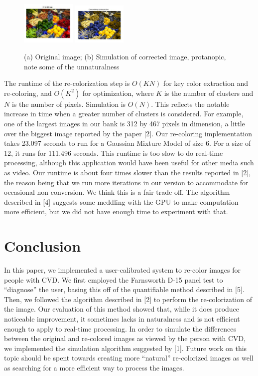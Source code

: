 \documentclass[10pt,twocolumn,letterpaper]{article}
\begin{document}
\begin{figure}[h]
  \includegraphics[width=0.23\textwidth]{peppers2.png}
\includegraphics[width=0.23\textwidth]{peppers.png}
 \caption{(a) Original image; (b) Simulation of corrected image, protanopic, note some of the unnaturalness}
  \label{fig:peppers}
\end{figure}

The runtime of the re-colorization step is $O(KN)$ for key color extraction and re-coloring, and $O(K^{2})$ for optimization, where $K$ is the number of clusters and $N$ is the number of pixels. Simulation is $O(N)$. This reflects the notable increase in time when a greater number of clusters is considered. For example, one of the largest images in our bank is 312 by 467 pixels in dimension, a little over the biggest image reported by the paper [2]. Our re-coloring implementation takes 23.097 seconds to run for a Gaussian Mixture Model of size 6. For a size of 12, it runs for 111.496 seconds. This runtime is too slow to do real-time processing, although this application would have been useful for other media such as video. Our runtime is about four times slower than the results reported in [2], the reason being that we run more iterations in our version to accommodate for occasional non-conversion.  We think this is a fair trade-off.  The algorithm described in [4] suggests some meddling with the GPU to make computation more efficient, but we did not have enough time to experiment with that. 

\section{Conclusion}

In this paper, we implemented a user-calibrated system to re-color images for people with CVD. We first employed the Farnsworth D-15 panel test to “diagnose” the user, basing this off of the quantifiable method described in [5]. Then, we followed the algorithm described in [2] to perform the re-colorization of the image. Our evaluation of this method showed that, while it does produce noticeable improvement, it sometimes lacks in naturalness and is not efficient enough to apply to real-time processing. In order to simulate the differences between the original and re-colored images as viewed by the person with CVD, we implemented the simulation algorithm suggested by [1]. Future work on this topic should be spent towards creating more “natural” re-colorized images as well as searching for a more efficient way to process the images.
\end{document}
